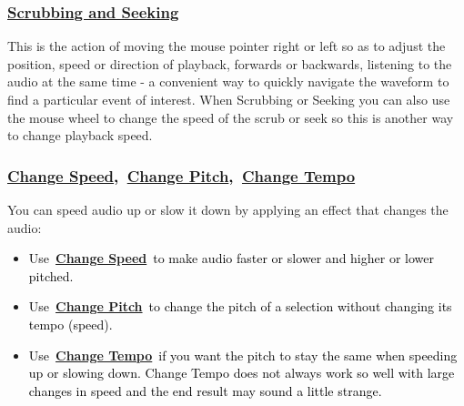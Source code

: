 \documentclass[letterpaper]{article}
\begin{document}
\subsubsection[Scrubbing and
Seeking]{\href{https://manual.audacityteam.org/man/scrubbing_and_seeking.html}{\textcolor[rgb]{0.3529412,0.21176471,0.5882353}{Scrubbing
and Seeking}}}
{\color{black}
This is the action of moving the mouse pointer right or left so as to adjust the position, speed or direction of
playback, forwards or backwards, listening to the audio at the same time - a convenient way to quickly navigate the
waveform to find a particular event of interest. When Scrubbing or Seeking you can also use the mouse wheel to change
the speed of the scrub or seek so this is another way to change playback speed.}

\subsubsection[Change Speed,~Change Pitch,~Change
Tempo]{\href{https://manual.audacityteam.org/man/change_speed.html}{\textcolor[rgb]{0.3529412,0.21176471,0.5882353}{Change
Speed}}\textcolor{black}{,~}\href{https://manual.audacityteam.org/man/change_pitch.html}{\textcolor[rgb]{0.3529412,0.21176471,0.5882353}{Change
Pitch}}\textcolor{black}{,~}\href{https://manual.audacityteam.org/man/change_tempo.html}{\textcolor[rgb]{0.3529412,0.21176471,0.5882353}{Change
Tempo}}}
{\color{black}
You can speed audio up or slow it down by applying an effect that changes the audio:}

\begin{itemize}
\item
\textcolor{black}{Use~}\href{https://manual.audacityteam.org/man/change_speed.html}{\textbf{\textcolor[rgb]{0.3529412,0.21176471,0.5882353}{Change
Speed}}}\textcolor{black}{~to make audio faster or slower and higher or lower pitched.}
\item
\textcolor{black}{Use~}\href{https://manual.audacityteam.org/man/change_pitch.html}{\textbf{\textcolor[rgb]{0.3529412,0.21176471,0.5882353}{Change
Pitch}}}\textcolor{black}{~to change the pitch of a selection without changing its tempo (speed).}
\item
\textcolor{black}{Use~}\href{https://manual.audacityteam.org/man/change_tempo.html}{\textbf{\textcolor[rgb]{0.3529412,0.21176471,0.5882353}{Change
Tempo}}}\textcolor{black}{~if you want the pitch to stay the same when speeding up or slowing down. Change Tempo does
not always work so well with large changes in speed and the end result may sound a little strange.}
\end{itemize}
\end{document}
